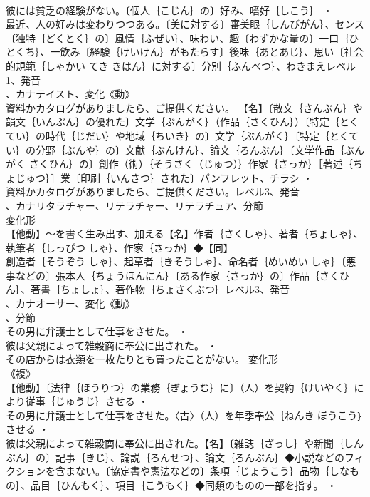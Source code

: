 \documentclass[8pt]{extreport}
\begin{document}
\begin{CJK}{UTF8}{min}
\\	彼には貧乏の経験がない。〔個人｛こじん｝の〕好み、嗜好｛しこう｝ ・
\\	最近、人の好みは変わりつつある。〔美に対する〕審美眼｛しんびがん｝、センス〔独特｛どくとく｝の〕風情｛ふぜい｝、味わい、趣〔わずかな量の〕一口｛ひとくち｝、一飲み〔経験｛けいけん｝がもたらす〕後味｛あとあじ｝、思い〔社会的規範｛しゃかい てき きはん｝に対する〕分別｛ふんべつ｝、わきまえレベル1、発音
\\	、カナテイスト、変化《動》
\\	資料かカタログがありましたら、ご提供ください。		【名】〔散文｛さんぶん｝や韻文｛いんぶん｝の優れた〕文学｛ぶんがく｝（作品｛さくひん｝）〔特定｛とくてい｝の時代｛じだい｝や地域｛ちいき｝の〕文学｛ぶんがく｝〔特定｛とくてい｝の分野｛ぶんや｝の〕文献｛ぶんけん｝、論文｛ろんぶん｝〔文学作品｛ぶんがく さくひん｝の〕創作（術）｛そうさく（じゅつ）｝作家｛さっか｝［著述｛ちょじゅつ｝］業〔印刷｛いんさつ｝された〕パンフレット、チラシ ・
\\	資料かカタログがありましたら、ご提供ください。レベル3、発音
\\	、カナリタラチャー、リテラチャー、リテラチュア、分節
\\	変化形 
\\	【他動】～を書く生み出す、加える【名】作者｛さくしゃ｝、著者｛ちょしゃ｝、執筆者｛しっぴつ しゃ｝、作家｛さっか｝◆【同】
\\	創造者｛そうぞう しゃ｝、起草者｛きそうしゃ｝、命名者｛めいめい しゃ｝〔悪事などの〕張本人｛ちょうほんにん｝〔ある作家｛さっか｝の〕作品｛さくひん｝、著書｛ちょしょ｝、著作物｛ちょさくぶつ｝レベル3、発音
\\	、カナオーサー、変化《動》
\\	、分節
\\	その男に弁護士として仕事をさせた。 ・
\\	彼は父親によって雑穀商に奉公に出された。 ・
\\	その店からは衣類を一枚たりとも買ったことがない。	変化形 
\\	《複》
\\	【他動】〔法律｛ほうりつ｝の業務｛ぎょうむ｝に〕（人）を契約｛けいやく｝により従事｛じゅうじ｝させる ・
\\	その男に弁護士として仕事をさせた。〈古〉（人）を年季奉公｛ねんき ぼうこう｝させる ・
\\	彼は父親によって雑穀商に奉公に出された。【名】〔雑誌｛ざっし｝や新聞｛しんぶん｝の〕記事｛きじ｝、論説｛ろんせつ｝、論文｛ろんぶん｝◆小説などのフィクションを含まない。〔協定書や憲法などの〕条項｛じょうこう｝品物｛しなもの｝、品目｛ひんもく｝、項目｛こうもく｝◆同類のものの一部を指す。 ・

\end{CJK}
\end{document}
